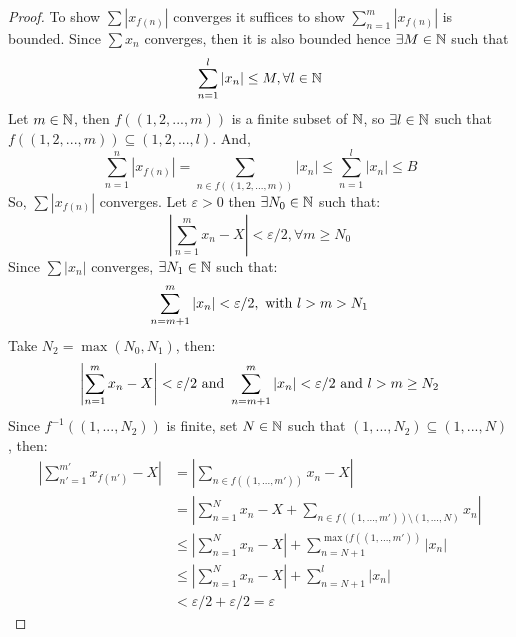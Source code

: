 \begin{proof}
    To show $\sum |x_{f(n)}|$ converges it suffices to show $\sum_{n=1}^m |x_{f(n)}|$ is bounded. Since $\sum x_n$ converges, then it is also bounded hence $\exists M \in \mathbb{N}$ such that
    \begin{equation*}
        \sum \limits_{n=1}^l |x_n| \leq M, \forall l \in \mathbb{N}
    \end{equation*}
    Let $m \in \mathbb{N}$, then $f((1, 2, ..., m))$ is a finite subset of $\mathbb{N}$, so $\exists l \in \mathbb{N}$ such that $f((1, 2, ..., m)) \subseteq (1, 2, ..., l)$. And,
    \begin{equation*}
        \sum \limits_{n=1}^n |x_{f(n)}| = \sum \limits_{n \in f((1, 2, ..., m))} |x_n| \leq \sum \limits_{n=1}^l |x_n| \leq B
    \end{equation*}
    So, $\sum |x_{f(n)}|$ converges. Let $\varepsilon  > 0$ then $\exists N_0 \in \mathbb{N}$ such that:
    \begin{equation*}
        \left |
            \sum \limits_{n=1}^m x_n - X
        \right | < \varepsilon/2, \forall m \geq N_0
    \end{equation*}
    Since $\sum |x_n|$ converges, $\exists N_1 \in \mathbb{N}$ such that:
    \begin{equation*}
        \sum \limits_{n=m+1}^m |x_n| < \varepsilon/2, \textnormal{ with } l > m > N_1
    \end{equation*}
    Take $N_2 = \max(N_0, N_1)$, then:
    \begin{equation*}
        \left |
            \sum \limits_{n=1}^m x_n - X
        \right | < \varepsilon/2
        \textnormal{ and }
        \sum \limits_{n=m+1}^m |x_n| < \varepsilon/2
        \textnormal{ and }
        l > m \geq N_2
    \end{equation*}
    Since $f^{-1}((1, ..., N_2))$ is finite, set $N \in \mathbb{N}$ such that $(1, ..., N_2) \subseteq (1, ..., N)$, then:
    \begin{align*}
        \left |
            \sum \limits_{n'=1}^{m'} x_{f(n')} - X
        \right | &= 
        \left |
            \sum \limits_{n \in f(( 1, ..., m'))} x_n - X
        \right | \\
        &= \left |
            \sum \limits_{n=1}^N x_n - X
            + \sum \limits_{n \in f((1, ..., m')) \setminus (1, ..., N)} x_n
        \right | \\
        &\leq
        \left |
            \sum \limits_{n=1}^N x_n - X
        \right | + \sum \limits_{n=N+1}^{\max (f((1, ..., m'))} |x_n|  \\
        &\leq 
        \left |
            \sum \limits_{n=1}^N x_n - X
        \right | + \sum \limits_{n=N+1}^{l} |x_n|  \\
        &< \varepsilon/2 + \varepsilon/2 = \varepsilon
    \end{align*} 
\end{proof}